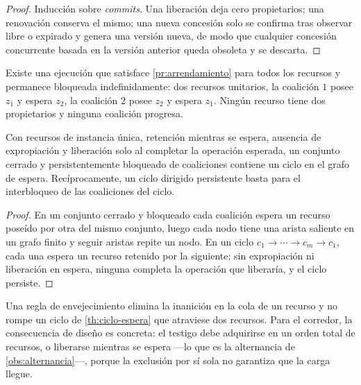 \begin{proof}
Inducción sobre \emph{commits}. Una liberación deja cero propietarios; una
renovación conserva el mismo; una nueva concesión solo se confirma tras
observar libre o expirado y genera una versión nueva, de modo que cualquier
concesión concurrente basada en la versión anterior queda obsoleta y se
descarta.
\end{proof}

\begin{proposicion}
\label{pr:exclusion-no-vivacidad}
Existe una ejecución que satisface \cref{pr:arrendamiento} para todos los
recursos y permanece bloqueada indefinidamente: dos recursos unitarios, la
coalición $1$ posee $z_1$ y espera $z_2$, la coalición $2$ posee $z_2$ y
espera $z_1$. Ningún recurso tiene dos propietarios y ninguna coalición
progresa.
\end{proposicion}

\begin{teorema}
\label{th:ciclo-espera}
Con recursos de instancia única, retención mientras se espera, ausencia de
expropiación y liberación solo al completar la operación esperada, un
conjunto cerrado y persistentemente bloqueado de coaliciones contiene un ciclo
en el grafo de espera. Recíprocamente, un ciclo dirigido persistente basta
para el interbloqueo de las coaliciones del ciclo.
\end{teorema}

\begin{proof}
En un conjunto cerrado y bloqueado cada coalición espera un recurso poseído
por otra del mismo conjunto, luego cada nodo tiene una arista saliente en un
grafo finito y seguir aristas repite un nodo. En un ciclo
$c_1\to\cdots\to c_m\to c_1$, cada una espera un recurso retenido por la
siguiente; sin expropiación ni liberación en espera, ninguna completa la
operación que liberaría, y el ciclo persiste.
\end{proof}

\begin{observacion}
\label{obs:equidad-interbloqueo}
Una regla de envejecimiento elimina la inanición en la cola de un recurso y no
rompe un ciclo de \cref{th:ciclo-espera} que atraviese dos recursos. Para el
corredor, la consecuencia de diseño es concreta: el testigo debe adquirirse
en un orden total de recursos, o liberarse mientras se espera —lo que es la
alternancia de \cref{obs:alternancia}—, porque la exclusión por sí sola no
garantiza que la carga llegue.
\end{observacion}

